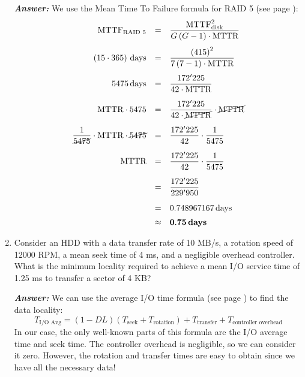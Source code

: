 \begin{enumerate}
    \textcolor{Green3}{\textbf{\emph{Answer:}}} We use the Mean Time To Failure formula for RAID 5 (see page \pageref{eq: RAID 5 - MTTF}):
    \begin{equation*}
        \begin{array}{rcl}
            \text{MTTF}_{\text{RAID 5}} &=& \dfrac{\text{MTTF}_{\text{disk}}^{2}}{G\left(G-1\right) \cdot \text{MTTR}} \\ [1.3em]
            \left(15 \cdot 365\right) \, \text{days} &=& \dfrac{\left(415\right)^{2}}{7\left(7-1\right) \cdot \text{MTTR}} \\ [1.3em]
            5475 \, \text{days} &=& \dfrac{172'225}{42 \cdot \text{MTTR}} \\ [1.3em]
            \text{MTTR} \cdot 5475 &=& \dfrac{172'225}{42 \cdot \cancel{\text{MTTR}}} \cdot \cancel{\text{MTTR}} \\ [1.3em]
            \dfrac{1}{\cancel{5475}} \cdot \text{MTTR} \cdot \cancel{5475} &=& \dfrac{172'225}{42} \cdot \dfrac{1}{5475} \\ [1.3em]
            \text{MTTR} &=& \dfrac{172'225}{42} \cdot \dfrac{1}{5475} \\ [1.3em]
            &=& \dfrac{172'225}{229'950} \\ [1.3em]
            &=& 0.748967167 \, \text{days} \\ [.5em]
            &\approx& \mathbf{0.75} \, \textbf{days}
        \end{array}
    \end{equation*}


    \item Consider an HDD with a data transfer rate of 10 MB/s, a rotation speed of 12000 RPM, a mean seek time of 4 ms, and a negligible overhead controller. What is the minimum locality required to achieve a mean I/O service time of 1.25 ms to transfer a sector of 4 KB?

    \textcolor{Green3}{\textbf{\emph{Answer:}}} We can use the average I/O time formula (see page \pageref{eq: Input Output average time}) to find the data locality:
    \begin{equation*}
        T_{\text{I/O Avg}} = \left(1 - DL\right)\left(T_{\text{seek}} + T_{\text{rotation}}\right) + T_{\text{transfer}} + T_{\text{controller overhead}}
    \end{equation*}
    In our case, the only well-known parts of this formula are the I/O average time and seek time. The controller overhead is negligible, so we can consider it zero. However, the rotation and transfer times are easy to obtain since we have all the necessary data!


\end{enumerate}
